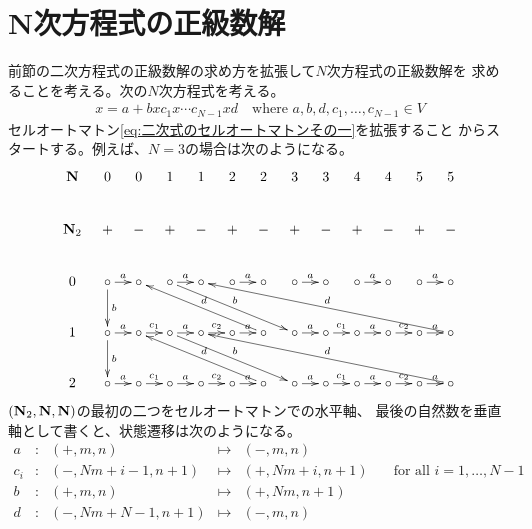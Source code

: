 {\section{N次方程式の正級数解}\label{s1:N次方程式の正級数解} %
	前節の二次方程式の正級数解の求め方を拡張して$N$次方程式の正級数解を
	求めることを考える。次の$N$次方程式を考える。
	\begin{equation}\label{eq:求めるN次式}\begin{split}
		x = a + bxc_1x\cdots c_{N-1}xd
		\quad\text{where } a,b,d,c_1,\dots,c_{N-1}\in V
	\end{split}\end{equation}
	セルオートマトン\eqref{eq:二次式のセルオートマトンその一}を拡張すること
	からスタートする。例えば、$N=3$の場合は次のようになる。
	\begin{equation*}\xymatrix@C=2ex{
		\sizen & 0 & 0 & 1 & 1 & 2 & 2 & 3 & 3 & 4 & 4 & 5 & 5 \\
		\sizen_2 & + & - & + & - & + & - & + & - & + & - & + & - \\
		0 & \circ \ar[r]^a \ar[d]^b & \circ & \circ \ar[r]^a  \ar[drrrr]^b 
			& \circ & \circ \ar[r]^a & \circ & \circ \ar[r]^a & \circ
			& \circ \ar[r]^a & \circ & \circ \ar[r]^a & \circ  \\
		1 & \circ \ar[r]^a \ar[d]^b & \circ \ar[r]^{c_1}
			& \circ \ar[r]^a \ar[drrrr]^b & \circ \ar[r]^{c_2} 
			& \circ \ar[r]^a & \circ \ar[ullll]_d 
			& \circ \ar[r]^a & \circ \ar[r]^{c_1}
			& \circ \ar[r]^a & \circ \ar[r]^{c_2} 
			& \circ \ar[r]^a & \circ \ar[ullllllll]_d \\
		2 & \circ \ar[r]^a & \circ \ar[r]^{c_1}
			& \circ \ar[r]^a & \circ \ar[r]^{c_2} 
			& \circ \ar[r]^a & \circ \ar[ullll]_d 
			& \circ \ar[r]^a & \circ \ar[r]^{c_1}
			& \circ \ar[r]^a & \circ \ar[r]^{c_2} 
			& \circ \ar[r]^a & \circ \ar[ullllllll]_d \\
	}\end{equation*}
	$(\mathbf{N}_2,\mathbf{N},\mathbf{N})$の最初の二つをセルオートマトンでの水平軸、
	最後の自然数を垂直軸として書くと、状態遷移は次のようになる。
	\begin{equation*}\begin{array}{rcrcrl}
		a &:& (+,m,n) &\mapsto& (-,m,n) \\
		c_i &:& (-,Nm+i-1,n+1) &\mapsto& (+,Nm+i,n+1)
			& \quad\text{for all } i=1,\dots,N-1 \\
		b &:& (+,m,n) &\mapsto& (+,Nm,n+1) \\
		d &:& (-,Nm + N-1,n+1) &\mapsto& (-,m,n) \\

\end{array}
\end{equation*}}
